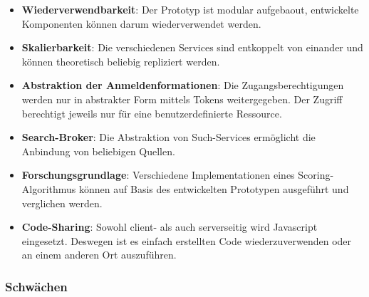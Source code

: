 \begin{itemize}
    \item \textbf{Wiederverwendbarkeit}: Der Prototyp ist modular aufgebaout, entwickelte Komponenten können darum wiederverwendet werden.
    \item \textbf{Skalierbarkeit}: Die verschiedenen Services sind entkoppelt von einander und können theoretisch beliebig repliziert werden.
    \item \textbf{Abstraktion der Anmeldenformationen}: Die Zugangsberechtigungen werden nur in abstrakter Form mittels Tokens weitergegeben. Der Zugriff berechtigt jeweils nur für eine benutzerdefinierte Ressource.
    \item \textbf{Search-Broker}: Die Abstraktion von Such-Services ermöglicht die Anbindung von beliebigen Quellen.
    \item \textbf{Forschungsgrundlage}: Verschiedene Implementationen eines Sco\-ring-Algorithmus können auf Basis des entwickelten Prototypen ausgeführt und verglichen werden.
    \item \textbf{Code-Sharing}: Sowohl client- als auch serverseitig wird Javascript eingesetzt. Deswegen ist es einfach erstellten Code wiederzuverwenden oder an einem anderen Ort auszuführen.
\end{itemize}

\subsubsection{Schwächen}

